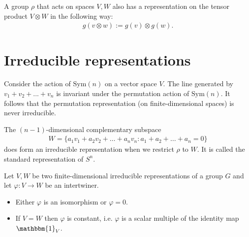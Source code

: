     \begin{example}
        A group $\rho$ that acts on spaces $V, W$ also has a representation on the tensor product  $V\otimes W$ in the following way:
        \begin{gather}
            g(v\otimes w) := g(v)\otimes g(w).
        \end{gather}
    \end{example}


\section{Irreducible representations}


    \begin{example}
        Consider the action of $\text{Sym}(n)$ on a vector space $V$. The line generated by $v_1+v_2+...+v_n$ is invariant under the permutation action of $\text{Sym}(n)$. It follows that the permutation representation (on finite-dimensional spaces) is never irreducible.

        The $(n-1)$-dimensional complementary subspace
        \begin{gather}
            W = \{a_1v_1 + a_2v_2 + \ldots + a_nv_n:a_1 + a_2 + \ldots + a_n = 0\}
        \end{gather}
        does form an irreducible representation when we restrict $\rho$ to $W$. It is called the standard representation of $S^n$.
    \end{example}

    \begin{theorem}\label{rep:schurs_lemma}
        Let $V, W$ be two finite-dimensional irreducible representations of a group $G$ and let $\varphi:V\rightarrow W$ be an intertwiner.
        \begin{itemize}
            \item Either $\varphi$ is an isomorphism or $\varphi = 0$.
            \item If $V = W$ then $\varphi$ is constant, i.e. $\varphi$ is a scalar multiple of the identity map $\mathbbm{1}_V$.
        \end{itemize}
    \end{theorem}

